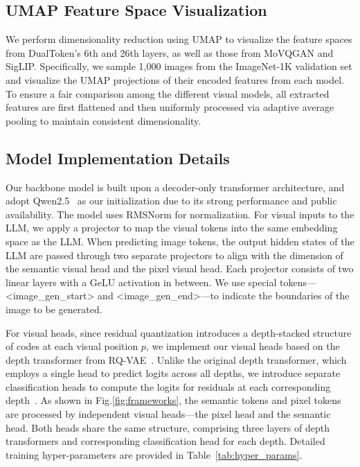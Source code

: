 

\subsection{UMAP Feature Space Visualization}

We perform dimensionality reduction using UMAP to visualize the feature spaces from DualToken's 6th and 26th layers, as well as those from MoVQGAN and SigLIP. Specifically, we sample 1,000 images from the ImageNet-1K validation set and visualize the UMAP projections of their encoded features from each model. To ensure a fair comparison among the different visual models, all extracted features are first flattened and then uniformly processed via adaptive average pooling to maintain consistent dimensionality.

\subsection{Model Implementation Details}
\label{implement}

Our backbone model is built upon a decoder-only transformer architecture, and adopt Qwen2.5~\citep{yang2024qwen2d5} as our initialization due to its strong performance and public availability. The model uses RMSNorm\cite{zhang2019rms} for normalization.
For visual inputs to the LLM, we apply a projector to map the visual tokens into the same embedding space as the LLM. When predicting image tokens, the output hidden states of the LLM are passed through two separate projectors to align with the dimension of the semantic visual head and the pixel visual head. Each projector consists of two linear layers with a GeLU activation in between. We use special tokens---<image\_gen\_start> and <image\_gen\_end>---to indicate the boundaries of the image to be generated.

For visual heads, since residual quantization introduces a depth-stacked structure of codes at each visual position $p$, we implement our visual heads based on the depth transformer from RQ-VAE~\citep{lee2022rqvae}. 
Unlike the original depth transformer, which employs a single head to predict logits across all depths, we introduce separate classification heads to compute the logits for residuals at each corresponding depth~\citep{li2025baichuanaudio}.
As shown in Fig.\ref{fig:frameworks}, the semantic tokens and pixel tokens are processed by independent visual heads---the pixel head and the semantic head. Both heads share the same structure, comprising three layers of depth transformers and corresponding classification head for each depth.
Detailed training hyper-parameters are provided in Table~\ref{tab:hyper_params}.

